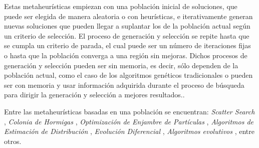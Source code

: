 Estas metaheurísticas empiezan con una población inicial de soluciones, que puede ser elegida de manera aleatoria o con heurísticas, e iterativamente generan nuevas soluciones que pueden llegar a suplantar los de la población actual según un criterio de selección. El proceso de generación y selección se repite hasta que se cumpla un criterio de parada, el cual puede ser un número de iteraciones fijas o hasta que la población converga a una región sin mejoras. Dichos procesos de generación y selección pueden ser sin memoria, es decir, sólo dependen de la población actual, como el caso de los algoritmos genéticos tradicionales o pueden ser con memoria y usar información adquirida durante el proceso de búsqueda para dirigir la generación y selección a mejores resultados.\cite{talbi2009metaheuristics}. 





Entre las metaheurísticas basadas en una población se encuentran: \emph{Scatter Search} \cite{talbi2009metaheuristics,glover1977heuristics}, \emph{Colonia de Hormigas} \cite{talbi2009metaheuristics,dorigo1992optimization}, \emph{Optimización de Enjambre de Partículas} \cite{talbi2009metaheuristics,eberhart2001swarm}, \emph{Algoritmos de Estimación de Distribución} \cite{talbi2009metaheuristics,lozano2006towards}, \emph{Evolución Diferencial} \cite{talbi2009metaheuristics,price2006differential}, \emph{Algoritmos evolutivos} \cite{talbi2009metaheuristics}, entre otros.


